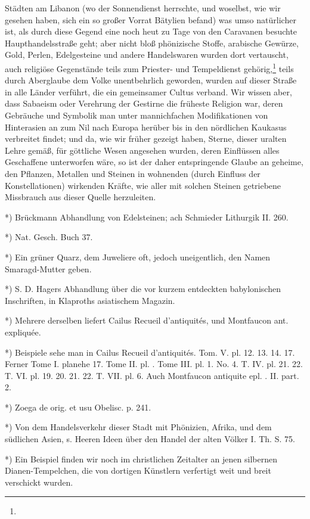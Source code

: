 \documentclass[a4paper, 11pt, oneside, polutonikogreek, german]{article}
\begin{document}
Städten am Libanon (wo der Sonnendienst herrschte, und woselbst, wie wir gesehen haben, sich ein so großer Vorrat Bätylien befand) was umso natürlicher ist, als durch diese Gegend eine noch heut zu Tage von den Caravanen besuchte Haupthandelsstraße geht; aber nicht bloß phönizische Stoffe, arabische Gewürze, Gold, Perlen, Edelgesteine und andere Handelswaren wurden dort vertauscht, auch religiöse Gegenstände teils zum Priester- und Tempeldienst gehörig,\footnote{} teils durch Aberglaube dem Volke unentbehrlich geworden, wurden auf dieser Straße in alle Länder verführt, die ein gemeinsamer Cultus verband. Wir wissen aber, dass Sabaeism oder Verehrung der Gestirne die früheste Religion war, deren Gebräuche und Symbolik man unter mannichfachen Modifikationen von Hinterasien an zum Nil nach Europa herüber bis in den nördlichen Kaukasus verbreitet findet; und da, wie wir früher gezeigt haben, Sterne, dieser uralten Lehre gemäß, für göttliche Wesen angesehen wurden, deren Einflüssen alles Geschaffene unterworfen wäre, so ist der daher entspringende Glaube an geheime, den Pflanzen, Metallen und Steinen in wohnenden (durch Einfluss der Konstellationen) wirkenden Kräfte, wie aller mit solchen Steinen getriebene Missbrauch aus dieser Quelle herzuleiten.

*) Brückmann Abhandlung von Edelsteinen; ach Schmieder Lithurgik II. 260.

*) Nat. Gesch. Buch 37.

*) Ein grüner Quarz, dem Juweliere oft, jedoch uneigentlich, den Namen Smaragd-Mutter geben.

*) S. D. Hagers Abhandlung über die vor kurzem entdeckten babylonischen Inschriften, in Klaproths asiatischem Magazin.

*) Mehrere derselben liefert Cailus Recueil d'antiquités, und Montfaucon ant. expliquée.

*) Beispiele sehe man in Cailus Recueil d'antiquités. Tom. V. pl. 12. 13. 14. 17. Ferner Tome I. planehe 17. Tome II. pl. . Tome III. pl. 1. No. 4. T. IV. pl. 21. 22. T. VI. pl. 19. 20. 21. 22. T. VII. pl. 6. Auch Montfaucon antiquite epl. . II. part. 2.

*) Zoega de orig. et usu Obelisc. p. 241.

*) Von dem Handelsverkehr dieser Stadt mit Phönizien, Afrika, und dem südlichen Asien, s. Heeren Ideen über den Handel der alten Völker I. Th. S. 75.

*) Ein Beispiel finden wir noch im christlichen Zeitalter an jenen silbernen Dianen-Tempelchen, die von dortigen Künstlern verfertigt weit und breit verschickt wurden.
\end{document}
